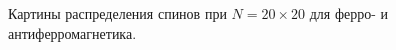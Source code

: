 \documentclass[12pt,a4paper]{article}
\begin{document}
\begin{figure}[!htb]
            \hspace{8pt}%
            \hspace{8pt}%
            \caption[]{Картины распределения спинов при $N=20\times 20$ для ферро- и антиферромагнетика.}%
            \label{fig:1}%
        \end{figure}
\end{document}
